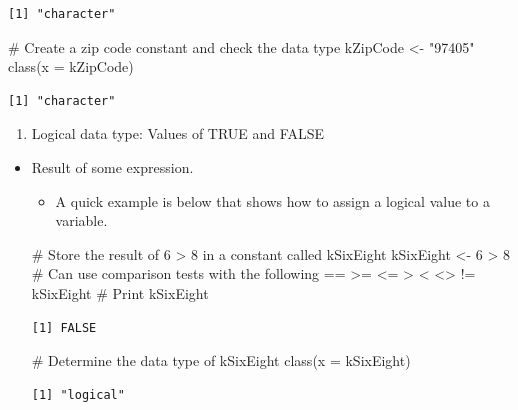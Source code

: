 \documentclass[
  letterpaper,
  DIV=11,
  numbers=noendperiod]{scrreprt}
\newenvironment{Shaded}{\begin{snugshade}}{\end{snugshade}}
\newcommand{\AttributeTok}[1]{\textcolor[rgb]{0.40,0.45,0.13}{#1}}
\newcommand{\CommentTok}[1]{\textcolor[rgb]{0.37,0.37,0.37}{#1}}
\newcommand{\DecValTok}[1]{\textcolor[rgb]{0.68,0.00,0.00}{#1}}
\newcommand{\FunctionTok}[1]{\textcolor[rgb]{0.28,0.35,0.67}{#1}}
\newcommand{\NormalTok}[1]{\textcolor[rgb]{0.00,0.23,0.31}{#1}}
\newcommand{\OtherTok}[1]{\textcolor[rgb]{0.00,0.23,0.31}{#1}}
\newcommand{\SpecialCharTok}[1]{\textcolor[rgb]{0.37,0.37,0.37}{#1}}
\newcommand{\StringTok}[1]{\textcolor[rgb]{0.13,0.47,0.30}{#1}}
\providecommand{\tightlist}{%
  \setlength{\itemsep}{0pt}\setlength{\parskip}{0pt}}\usepackage{longtable,booktabs,array}
\begin{document}
\begin{verbatim}
[1] "character"
\end{verbatim}

\begin{Shaded}
\begin{Highlighting}[]
\CommentTok{\# Create a zip code constant and check the data type}
\NormalTok{kZipCode }\OtherTok{\textless{}{-}} \StringTok{"97405"}
\FunctionTok{class}\NormalTok{(}\AttributeTok{x =}\NormalTok{ kZipCode)}
\end{Highlighting}
\end{Shaded}

\begin{verbatim}
[1] "character"
\end{verbatim}

\begin{enumerate}
\def\labelenumi{\arabic{enumi}.}
\setcounter{enumi}{3}
\tightlist
\item
  Logical data type: Values of TRUE and FALSE
\end{enumerate}

\begin{itemize}
\item
  Result of some expression.

  \begin{itemize}
  \tightlist
  \item
    A quick example is below that shows how to assign a logical value to
    a variable.
  \end{itemize}

\begin{Shaded}
\begin{Highlighting}[]
\CommentTok{\# Store the result of 6 \textgreater{} 8 in a constant called kSixEight}
\NormalTok{kSixEight }\OtherTok{\textless{}{-}} \DecValTok{6} \SpecialCharTok{\textgreater{}} \DecValTok{8}
\CommentTok{\# Can use comparison tests with the following == \textgreater{}= \textless{}= \textgreater{} \textless{} \textless{}\textgreater{} !=}
\NormalTok{kSixEight  }\CommentTok{\# Print kSixEight}
\end{Highlighting}
\end{Shaded}

\begin{verbatim}
[1] FALSE
\end{verbatim}

\begin{Shaded}
\begin{Highlighting}[]
\CommentTok{\# Determine the data type of kSixEight}
\FunctionTok{class}\NormalTok{(}\AttributeTok{x =}\NormalTok{ kSixEight)}
\end{Highlighting}
\end{Shaded}

\begin{verbatim}
[1] "logical"
\end{verbatim}
\end{itemize}
\end{document}
